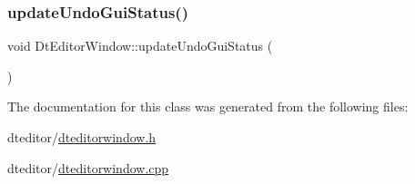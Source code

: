 \subsubsection{\texorpdfstring{updateUndoGuiStatus()}{updateUndoGuiStatus()}}
{\footnotesize\ttfamily void Dt\+Editor\+Window\+::update\+Undo\+Gui\+Status (\begin{DoxyParamCaption}{ }\end{DoxyParamCaption})\hspace{0.3cm}{\ttfamily [protected]}}



The documentation for this class was generated from the following files\+:\begin{DoxyCompactItemize}
\item 
dteditor/\mbox{\hyperlink{dteditorwindow_8h}{dteditorwindow.\+h}}\item 
dteditor/\mbox{\hyperlink{dteditorwindow_8cpp}{dteditorwindow.\+cpp}}\end{DoxyCompactItemize}
